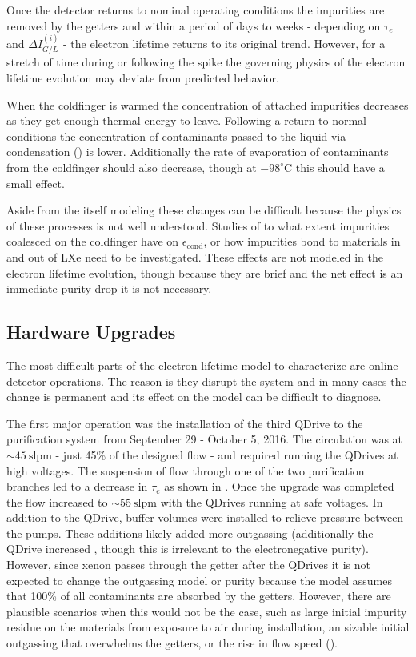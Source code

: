 Once the detector returns to nominal operating conditions the impurities are removed by the getters and within a period of days to
weeks - depending on $\tau_e$ and $\Delta I_{G/L}^{(i)}$ - the electron lifetime returns to its original trend.  However, for a stretch of
time during or following the spike the governing physics of the electron lifetime evolution may deviate from predicted behavior.

When the coldfinger is warmed the concentration of attached impurities decreases as they get enough thermal energy to leave.  Following
a return to normal conditions the concentration of contaminants passed to the liquid via condensation
() is lower.  Additionally the rate of evaporation of contaminants from
the coldfinger should also decrease, though at $-98^{\circ} \mathrm{C}$ this should have a small effect.

Aside from the itself modeling these changes can be difficult because the physics of these processes is not well understood.  Studies
of to what extent impurities coalesced on the coldfinger have on $\epsilon_{\mathrm{cond}}$, or how impurities bond to materials in and
out of LXe need to be investigated.  These effects are not modeled in the electron lifetime evolution, though because they are brief and
the net effect is an immediate purity drop it is not necessary.



\subsection{Hardware Upgrades}
\label{subsec:electron_lifetime_model_ops}
The most difficult parts of the electron lifetime model to characterize are online detector operations.  The reason is they disrupt the
system and in many cases the change is permanent and its effect on the model can be difficult to diagnose.

The first major operation was the installation of the third QDrive to the purification system from September 29 - October 5, 2016.  The
circulation was at ${\sim} 45\ \mathrm{slpm}$ - just 45\% of the designed flow - and required running the QDrives at high voltages.  The
suspension of flow through one of the two purification branches led to a decrease in $\tau_e$ as shown in
.  Once the upgrade was completed the flow increased to
${\sim}55\ \mathrm{slpm}$ with
the QDrives running at safe voltages.  In addition to the QDrive, buffer volumes were installed to relieve pressure between
the pumps.  These additions likely added more outgassing
(additionally the QDrive increased , though this is irrelevant to the electronegative purity).  However, since xenon passes
through the
getter after the QDrives it is not expected to change the outgassing model or purity because the model assumes that 100\% of all
contaminants are
absorbed by the getters.  However, there are plausible scenarios when this would not be the case, such as large initial impurity residue
on the materials from exposure to air during installation, an sizable initial outgassing that overwhelms the getters, or the rise
in flow speed ().

